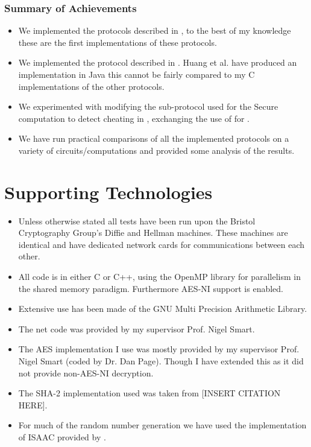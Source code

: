 \documentclass[ %
                    author={Nicholas Tutte},
                supervisor={Prof. Nigel Smart},
                    degree={MEng},
                     title={Secure Two Party Computation},
                  subtitle={A practical comparison of recent protocols},
                      type={Research - GG1K},
                      year={2015} ]{dissertation}
\begin{document}
			\subsubsection*{Summary of Achievements}
				\begin{itemize}
					\item We implemented the protocols described in \cite{LindellAndPinkas2011, Lindell_CnC_2013}, to the best of my knowledge these are the first implementations of these protocols.
					\item We implemented the protocol described in \cite{Katz_Symm_CnC_2013}. Huang et al. have produced an implementation in Java this cannot be fairly compared to my C implementations of the other protocols. 
					\item We experimented with modifying the sub-protocol used for the Secure computation to detect cheating in \cite{Lindell_CnC_2013}, exchanging the use of \cite{LindellAndPinkas2011} for \cite{Katz_Symm_CnC_2013}.
					\item We have run practical comparisons of all the implemented protocols on a variety of circuits/computations and provided some analysis of the results.
				\end{itemize}

		\section*{Supporting Technologies}
			\begin{itemize}
					\item Unless otherwise stated all tests have been run upon the Bristol Cryptography Group's Diffie and Hellman machines. These machines are identical and have dedicated network cards for communications between each other.
					\item All code is in either C or C++, using the OpenMP library for parallelism in the shared memory paradigm. Furthermore AES-NI support is enabled.
					\item Extensive use has been made of the GNU Multi Precision Arithmetic Library.
					\item The net code was provided by my supervisor Prof. Nigel Smart.
					\item The AES implementation I use was mostly provided by my supervisor Prof. Nigel Smart (coded by Dr. Dan Page). Though I have extended this as it did not provide non-AES-NI decryption.
					\item The SHA-2 implementation used was taken from [INSERT CITATION HERE].
					\item For much of the random number generation we have used the implementation of ISAAC provided by \cite{ISAAC_Implementation}.
			\end{itemize}
\end{document}
